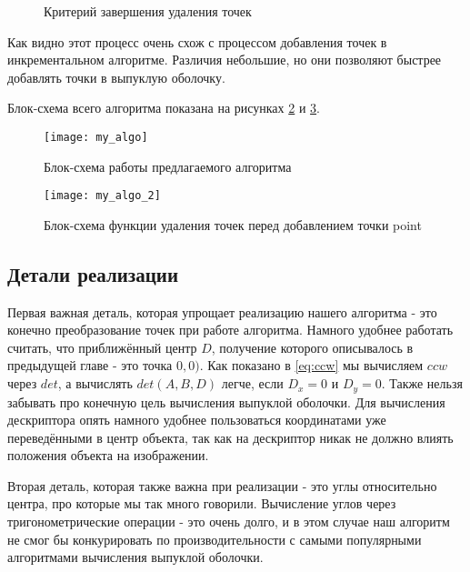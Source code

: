 \begin{figure}
	{\centering
		\hfill
		\subbottom[\label{img:my_points_deletion_2_1}]{%
			}
		\hfill
		\subbottom[\label{img:my_points_deletion_2_2}]{%
			}
		\hfill
	}
	\caption{Критерий завершения удаления точек}
	\label{img:my_points_deletion_2}
\end{figure}

Как видно этот процесс очень схож с процессом добавления точек в инкрементальном алгоритме. Различия небольшие, но они позволяют быстрее добавлять точки в выпуклую оболочку.

Блок-схема всего алгоритма показана на рисунках \ref{img:my_algo} и \ref{img:my_algo_deletion}.

\begin{figure}
	\centering
	\texttt{[image: my\_algo]}
	\caption{Блок-схема работы предлагаемого алгоритма}
	\label{img:my_algo}
\end{figure}

\begin{figure}
	\centering
	\texttt{[image: my\_algo\_2]}
	\caption{Блок-схема функции удаления точек перед добавлением точки point}
	\label{img:my_algo_deletion}
\end{figure}

\subsection{Детали реализации} \label{subsect2_2_2}

Первая важная деталь, которая упрощает реализацию нашего алгоритма - это конечно преобразование точек при работе алгоритма. Намного удобнее работать считать, что приближённый центр $D$, получение которого описывалось в предыдущей главе - это точка $0, 0)$. Как показано в \ref{eq:ccw} мы вычисляем $ccw$ через $det$, а вычислять $det(A, B, D)$ легче, если $D_x = 0$ и $D_y = 0$. Также нельзя забывать про конечную цель вычисления выпуклой оболочки. Для вычисления дескриптора опять намного удобнее пользоваться координатами уже переведёнными в центр объекта, так как на дескриптор никак не должно влиять положения объекта на изображении.

Вторая деталь, которая также важна при реализации - это углы относительно центра, про которые мы так много говорили. Вычисление углов через тригонометрические операции - это очень долго, и в этом случае наш алгоритм не смог бы конкурировать по производительности с самыми популярными алгоритмами вычисления выпуклой оболочки.

